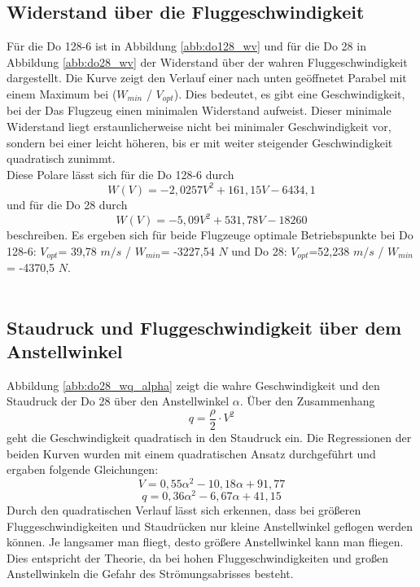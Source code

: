 \subsection{Widerstand über die Fluggeschwindigkeit}
Für die Do 128-6 ist in Abbildung \ref{abb:do128_wv} und für die Do 28 in Abbildung \ref{abb:do28_wv} der Widerstand über der wahren Fluggeschwindigkeit dargestellt. Die Kurve zeigt den Verlauf einer nach unten geöffnetet Parabel mit einem Maximum bei ($W_{min}$ / $V_{opt}$). Dies bedeutet, es gibt eine Geschwindigkeit, bei der Das Flugzeug einen minimalen Widerstand aufweist. Dieser minimale Widerstand liegt erstaunlicherweise nicht bei minimaler Geschwindigkeit vor, sondern bei einer leicht höheren, bis er mit weiter steigender Geschwindigkeit quadratisch zunimmt. \\
Diese Polare lässt sich für die Do 128-6 durch 
\begin{equation}
W(V)=-2,0257V^2+161,15V-6434,1
\end{equation}
und für die Do 28 durch 
\begin{equation}
W(V)=-5,09V^2+531,78V-18260
\end{equation}
 beschreiben. Es ergeben sich für beide Flugzeuge optimale Betriebspunkte bei Do 128-6: $V_{opt}$= 39,78 $m/s$ / 
$W_{min}$= -3227,54 $N$ und Do 28: $V_{opt}$=52,238 $m/s$ / 
$W_{min}$= -4370,5 $N$.
\\\\
\subsection{Staudruck und Fluggeschwindigkeit über dem Anstellwinkel}
Abbildung \ref{abb:do28_wq_alpha} zeigt die wahre Geschwindigkeit und den Staudruck der Do 28 über den Anstellwinkel $\alpha$. Über den Zusammenhang 
\begin{equation}
q = \frac{\rho}{2} \cdot V^2
\end{equation}
geht die Geschwindigkeit quadratisch in den Staudruck ein.
Die Regressionen der beiden Kurven wurden mit einem quadratischen Ansatz durchgeführt und ergaben folgende Gleichungen:
\begin{equation}
V = 0,55\alpha^2 - 10,18\alpha +91,77
\end{equation}
\begin{equation}
q = 0,36\alpha^2 -6,67\alpha +41,15
\end{equation}
Durch den quadratischen Verlauf lässt sich erkennen, dass bei größeren Fluggeschwindigkeiten und Staudrücken nur kleine Anstellwinkel geflogen werden können. Je langsamer man fliegt, desto größere Anstellwinkel kann man fliegen. Dies entspricht der Theorie, da bei hohen Fluggeschwindigkeiten und großen Anstellwinkeln die Gefahr des Strömungsabrisses besteht.
\vspace{5mm}
